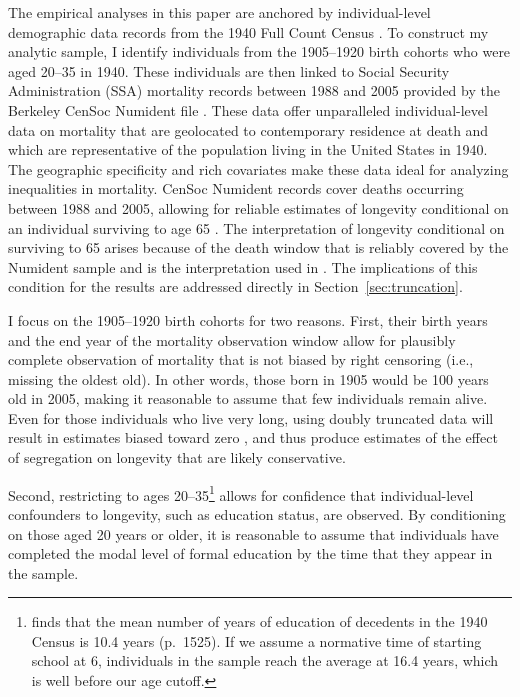 \documentclass[11pt]{article}
\begin{document}
The empirical analyses in this paper are anchored by individual-level demographic data records from the 1940 Full Count Census \citep{ruggles_ipums_2023}. To construct my analytic sample, I identify individuals from the 1905--1920 birth cohorts who were aged 20--35 in 1940.
These individuals are then linked to Social Security Administration (SSA) mortality records between 1988 and 2005 provided by the Berkeley CenSoc Numident file \citep{breen_censoc_2023}.
These data offer unparalleled individual-level data on mortality that are geolocated to contemporary residence at death and which are representative of the population living in the United States in 1940. The geographic specificity and rich covariates make these data ideal for analyzing inequalities in mortality.
CenSoc Numident records cover deaths occurring between 1988 and 2005, allowing for reliable estimates of longevity conditional on an individual surviving to age 65 \citep{goldstein_mortality_2023}. The interpretation of longevity conditional on surviving to 65 arises because of the death window that is reliably covered by the Numident sample \citep{goldstein_mortality_2023} and is the interpretation used in \citet{breen_longevity_2024}. The implications of this condition for the results are addressed directly in Section~\ref{sec:truncation}.

I focus on the 1905--1920 birth cohorts for two reasons. First, their birth years and the end year of the mortality observation window allow for plausibly complete observation of mortality that is not biased by right censoring (i.e., missing the oldest old).
In other words, those born in 1905 would be 100 years old in 2005, making it reasonable to assume that few individuals remain alive. Even for those individuals who live very long, using doubly truncated data will result in estimates biased toward zero \citep{breen_longevity_2024}, and thus produce estimates of the effect of segregation on longevity that are likely conservative.

Second, restricting to ages 20--35\footnote{\citet{halpern-manners_effects_2020} finds that the mean number of years of education of decedents in the 1940 Census is 10.4 years (p.~1525). If we assume a normative time of starting school at 6, individuals in the sample reach the average at 16.4 years, which is well before our age cutoff.} allows for confidence that individual-level confounders to longevity, such as education status, are observed.
By conditioning on those aged 20 years or older, it is reasonable to assume that individuals have completed the modal level of formal education by the time that they appear in the sample.
\end{document}
